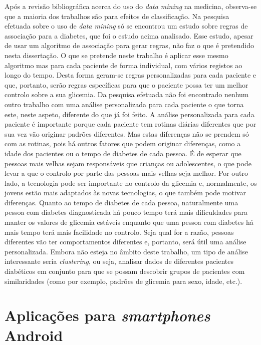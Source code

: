 Após a revisão bibliográfica acerca do uso do \textit{data mining} na medicina, observa-se que a maioria dos trabalhos são para efeitos de classificação. Na pesquisa efetuada sobre o uso de \textit{data mining} só se encontrou um estudo sobre regras de associação para a diabetes, que foi o estudo acima analisado. Esse estudo, apesar de usar um algoritmo de associação para gerar regras, não faz o que é pretendido nesta dissertação. 
O que se pretende neste trabalho é aplicar esse mesmo algoritmo mas para cada paciente de forma individual, com vários registos ao longo do tempo. Desta forma geram-se regras personalizadas para cada paciente e que, portanto, serão regras específicas para que o paciente possa ter um melhor controlo sobre a sua glicemia. Da pesquisa efetuada não foi encontrado nenhum outro trabalho com uma análise personalizada para cada paciente o que torna este, neste aspeto, diferente do que já foi feito. A análise personalizada para cada paciente é importante porque cada paciente tem rotinas diárias diferentes que por sua vez vão originar padrões diferentes. Mas estas diferenças não se prendem só com as rotinas, pois há outros fatores que podem originar diferenças, como a idade dos pacientes ou o tempo de diabetes de cada pessoa. É de esperar que pessoas mais velhas sejam responsáveis que crianças ou adolescentes, o que pode levar a que o controlo por parte das pessoas mais velhas seja melhor. Por outro lado, a tecnologia pode ser importante no controlo da glicemia e, normalmente, os jovens estão mais adaptados às novas tecnologias, o que também pode motivar diferenças. Quanto ao tempo de diabetes de cada pessoa, naturalmente uma pessoa com diabetes diagnosticada há pouco tempo terá mais dificuldades para manter os valores de glicemia estáveis enquanto que uma pessoa com diabetes há mais tempo terá mais facilidade no controlo. Seja qual for a razão, pessoas diferentes vão ter comportamentos diferentes e, portanto, será útil uma análise personalizada. Embora não esteja no âmbito deste trabalho, um tipo de análise interessante seria \textit{clustering}, ou seja, analisar dados de diferentes pacientes diabéticos em conjunto para que se possam descobrir grupos de pacientes com similaridades (como por exemplo, padrões de glicemia para sexo, idade, etc.).


\section{Aplicações para \textit{smartphones} Android}

